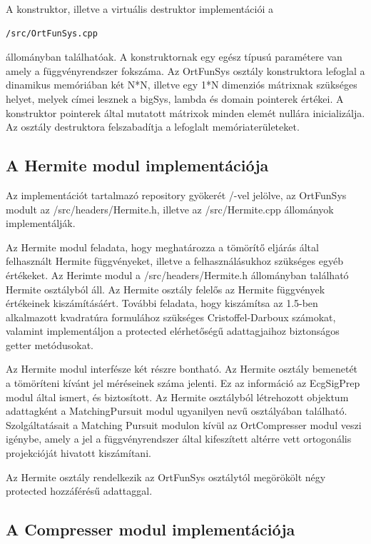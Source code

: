\documentclass[oneside,titlepage,12pt,a4paper]{report}
\begin{document}
\par A konstruktor, illetve a virtuális destruktor implementációi a \begin{verbatim}/src/OrtFunSys.cpp\end{verbatim} állományban találhatóak. A konstruktornak egy egész típusú paramétere van amely a függvényrendszer fokszáma. Az OrtFunSys osztály konstruktora lefoglal a dinamikus memóriában két N*N, illetve egy 1*N dimenziós mátrixnak szükséges helyet, melyek címei lesznek a bigSys, lambda és domain pointerek értékei. A konstruktor pointerek által mutatott mátrixok minden elemét nullára inicializálja. Az osztály destruktora felszabadítja a lefoglalt memóriaterületeket. 


\subsection{A Hermite modul implementációja}

Az implementációt tartalmazó repository gyökerét /-vel jelölve, az OrtFunSys modult  az /src/headers/Hermite.h, illetve az /src/Hermite.cpp állományok implementálják.
\par Az Hermite modul feladata, hogy meghatározza a tömörítő eljárás által felhasznált Hermite függvényeket, illetve a felhasználásukhoz szükséges egyéb értékeket. Az Herimte modul a /src/headers/Hermite.h állományban található Hermite osztályból áll. Az Hermite osztály felelős az Hermite függvények értékeinek kiszámításáért. További feladata, hogy kiszámítsa az 1.5-ben alkalmazott kvadratúra formulához szükséges Cristoffel-Darboux számokat, valamint implementáljon a protected elérhetőségű adattagjaihoz biztonságos getter metódusokat.
\par Az Hermite modul interfésze két részre bontható. Az Hermite osztály bemenetét a tömöríteni kívánt jel méréseinek száma jelenti. Ez az információ az EcgSigPrep modul által ismert, és biztosított. Az Hermite osztályból létrehozott objektum adattagként a MatchingPursuit modul ugyanilyen nevű osztályában található. Szolgáltatásait a Matching Pursuit modulon kívül az OrtCompresser modul veszi igénybe, amely a jel a függvényrendszer által kifeszített altérre vett ortogonális projekcióját hivatott kiszámítani. 
\par Az Hermite osztály rendelkezik az OrtFunSys osztálytól megörökölt négy protected hozzáférésű adattaggal. 

\subsection{A Compresser modul implementációja}
\end{document}
